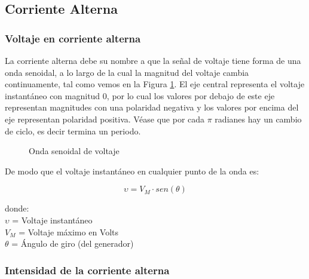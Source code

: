 \subsection{Corriente Alterna}
\label{sec:corriente-alterna}

\subsubsection{Voltaje en corriente alterna}
\label{sec:voltaje-en-ca}

La corriente alterna debe su nombre a que la señal de voltaje tiene forma de una onda senoidal, a lo largo de la cual la magnitud del voltaje cambia continuamente, tal como vemos en la Figura \ref{fig:senoidal-voltaje}. El eje central representa el voltaje instantáneo con magnitud $0$, por lo cual los valores por debajo de este eje representan magnitudes con una polaridad negativa y los valores por encima del eje representan polaridad positiva. Véase que por cada $\pi$ radianes hay un cambio de ciclo, es decir termina un periodo.

\begin{figure}[h!]
    \centering
    \caption{Onda senoidal de voltaje}
    \label{fig:senoidal-voltaje}
\end{figure}

De modo que el voltaje instantáneo en cualquier punto de la onda es:

\[
  \upsilon = V_{M} \cdotp sen(\theta)
\]

donde:\\
\(\upsilon\) = Voltaje instantáneo\\
\(V_M\) = Voltaje máximo en Volts \\
\(\theta\) = Ángulo de giro (del generador)

\subsubsection{Intensidad de la corriente alterna}
\label{sec:intensidad-en-ca}

